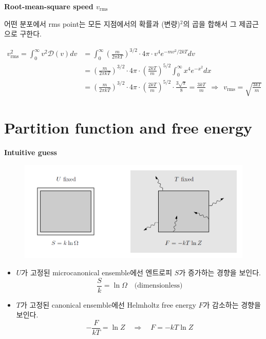 \documentclass{article}
\begin{document}
\noindent
\textbf{Root-mean-square speed $v_{\text{rms}}$}

어떤 분포에서 rms point는 모든 지점에서의 확률과 (변량)$^2$의 곱을 합해서 그 제곱근으로 구한다.

\begin{align} \nonumber
    v_{\text{rms}}^2 = \int_0^\infty v^2 \mathcal{D}(v)dv &= \int_{0}^{\infty} \left( \frac{m}{2\pi k T} \right)^{3/2}  \cdot 4\pi \cdot v^4 e^{-mv^2/2kT}dv \\ \nonumber
    &= \left( \frac{m}{2\pi k T} \right)^{3/2} \cdot 4\pi \cdot \left( \frac{2kT}{m} \right)^{5/2} \int_0^\infty x^4 e^{-x^2} dx\\
    &= \left( \frac{m}{2\pi k T} \right)^{3/2} \cdot 4\pi \cdot \left( \frac{2kT}{m} \right)^{5/2} \cdot \frac{3\sqrt{\pi}}{8} = \frac{3kT}{m} \ \ \Rightarrow \ \ \boxed{v_{\text{rms}} = \sqrt{\frac{3kT}{m}}}
\end{align}

\newpage

\section{Partition function and free energy}

\textbf{Intuitive guess}

\begin{figure}[h]
    \centering
    \includegraphics[width=0.7\linewidth]{images/fig5_1.png}
\end{figure}

\begin{itemize}
    \item $U$가 고정된 microcanonical ensemble에선 엔트로피 $S$가 증가하는 경향을 보인다.
    $$\frac{S}{k} = \ln \Omega \quad \text{(dimensionless)}$$
    \item $T$가 고정된 canonical ensemble에선 Helmholtz free energy $F$가 감소하는 경향을 보인다.
    $$-\frac{F}{kT} = \ln Z \quad \Rightarrow \quad F = -kT\ln Z$$
\end{itemize}
\end{document}
